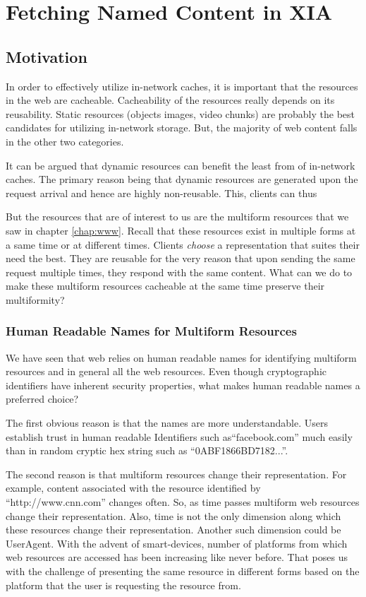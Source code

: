 \chapter{Fetching Named Content in XIA}
\label{chap:namedcontent}

\section{Motivation}

In order to effectively utilize in-network caches, it is important
that the resources in the web are cacheable. Cacheability of the
resources really depends on its reusability. Static resources (objects
images, video chunks) are probably the best candidates for utilizing
in-network storage. But, the majority of web content falls in the
other two categories.

It can be argued that dynamic resources can benefit the least from of
in-network caches. The primary reason being that dynamic resources are
generated upon the request arrival and hence are highly
non-reusable. This, clients can thus

But the resources that are of interest to us are the multiform
resources that we saw in chapter \ref{chap:www}. Recall that these
resources exist in multiple forms at a same time or at different
times. Clients \emph{choose} a representation that suites their need
the best. They are reusable for the very reason that upon sending the
same request multiple times, they respond with the same content. What
can we do to make these multiform resources cacheable at the same time
preserve their multiformity?

\subsection{Human Readable Names for Multiform Resources}

We have seen that web relies on human readable names for identifying
multiform resources and in general all the web resources. Even though
cryptographic identifiers have inherent security properties, what
makes human readable names a preferred choice?

The first obvious reason is that the names are more
understandable. Users establish trust in human readable Identifiers
such as``facebook.com'' much easily than in random cryptic hex string
such as ``0ABF1866BD7182...''.

The second reason is that multiform resources change their
representation. For example, content associated with the resource
identified by ``http://www.cnn.com'' changes often. So, as time passes
multiform web resources change their representation. Also, time is not
the only dimension along which these resources change their
representation. Another such dimension could be UserAgent. With the
advent of smart-devices, number of platforms from which web resources
are accessed has been increasing like never before. That poses us with
the challenge of presenting the same resource in different forms based
on the platform that the user is requesting the resource from.

